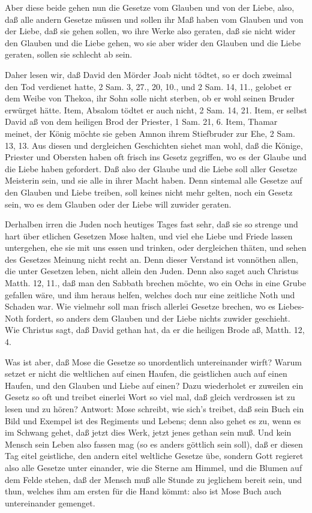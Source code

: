Aber diese beide gehen nun die Gesetze vom Glauben und von der Liebe, also, daß alle andern Gesetze müssen und sollen ihr Maß haben vom Glauben und von der Liebe, daß sie gehen sollen, wo ihre Werke also geraten, daß sie nicht wider den Glauben und die Liebe gehen, wo sie aber wider den Glauben und die Liebe geraten, sollen sie schlecht ab sein.

Daher lesen wir, daß David den Mörder Joab nicht tödtet, so er doch zweimal den Tod verdienet hatte, 2 Sam. 3, 27., 20, 10., und 2 Sam. 14, 11., gelobet er dem Weibe von Thekoa, ihr Sohn solle nicht sterben, ob er wohl seinen Bruder erwürget hätte. Item, Absalom tödtet er auch nicht, 2 Sam. 14, 21. Item, er selbst David aß von dem heiligen Brod der Priester, 1 Sam. 21, 6. Item, Thamar meinet, der König möchte sie geben Amnon ihrem Stiefbruder zur Ehe, 2 Sam. 13, 13. Aus diesen und dergleichen Geschichten siehet man wohl, daß die Könige, Priester und Obersten haben oft frisch ins Gesetz gegriffen, wo es der Glaube und die Liebe haben gefordert. Daß also der Glaube und die Liebe soll aller Gesetze Meisterin sein, und sie alle in ihrer Macht haben. Denn sintemal alle Gesetze auf den Glauben und Liebe treiben, soll keines nicht mehr gelten, noch ein Gesetz sein, wo es dem Glauben oder der Liebe will zuwider geraten.

Derhalben irren die Juden noch heutiges Tages fast sehr, daß sie so strenge und hart über etlichen Gesetzen Mose halten, und viel ehe Liebe und Friede lassen untergehen, ehe sie mit uns essen und trinken, oder dergleichen thäten, und sehen des Gesetzes Meinung nicht recht an. Denn dieser Verstand ist vonnöthen allen, die unter Gesetzen leben, nicht allein den Juden. Denn also saget auch Christus Matth. 12, 11., daß man den Sabbath brechen möchte, wo ein Ochs in eine Grube gefallen wäre, und ihm heraus helfen, welches doch nur eine zeitliche Noth und Schaden war. Wie vielmehr soll man frisch allerlei Gesetze brechen, wo es Liebes-Noth fordert, so anders dem Glauben und der Liebe nichts zuwider geschieht. Wie Christus sagt, daß David gethan hat, da er die heiligen Brode aß, Matth. 12, 4.


Was ist aber, daß Mose die Gesetze so unordentlich untereinander wirft? Warum setzet er nicht die weltlichen auf einen Haufen, die geistlichen auch auf einen Haufen, und den Glauben und Liebe auf einen? Dazu wiederholet er zuweilen ein Gesetz so oft und treibet einerlei Wort so viel mal, daß gleich verdrossen ist zu lesen und zu hören? Antwort: Mose schreibt, wie sich’s treibet, daß sein Buch ein Bild und Exempel ist des Regiments und Lebens; denn also gehet es zu, wenn es im Schwang gehet, daß jetzt dies Werk, jetzt jenes gethan sein muß. Und kein Mensch sein Leben also fassen mag (so es anders göttlich sein soll), daß er diesen Tag eitel geistliche, den andern eitel weltliche Gesetze übe, sondern Gott regieret also alle Gesetze unter einander, wie die Sterne am Himmel, und die Blumen auf dem Felde stehen, daß der Mensch muß alle Stunde zu jeglichem bereit sein, und thun, welches ihm am ersten für die Hand kömmt: also ist Mose Buch auch untereinander gemenget.


